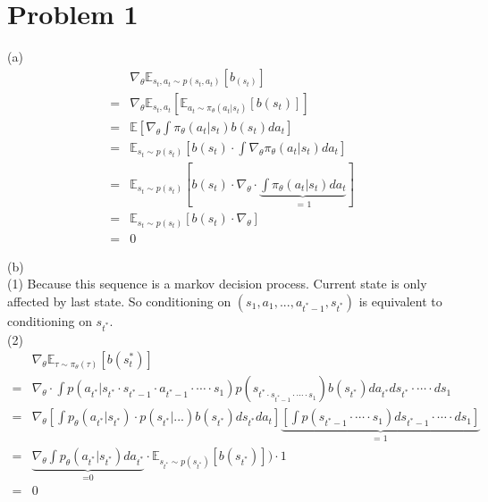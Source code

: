 \documentclass[12pt]{article}
\begin{document}
\pagebreak

\section{Problem 1}
(a)
\begin{equation}
\begin{aligned}
  & \nabla_\theta \mathbb{E}_{s_t, a_t \sim p(s_t, a_t)}[b_{(s_t)}]  \\
= & \nabla_\theta \mathbb{E}_{s_t, a_t}[\mathbb{E}_{a_t \sim \pi_\theta(a_t|s_t)}[b(s_t)]] \\
= & \mathbb{E} [\nabla_\theta \int \pi_\theta(a_t|s_t)b(s_t)da_t] \\
= & \mathbb{E}_{s_t \sim p(s_t)} [b(s_t) \cdot \int \nabla_\theta \pi_\theta(a_t|s_t)da_t] \\
= & \mathbb{E}_{s_t \sim p(s_t)}[b(s_t) \cdot \nabla_\theta \cdot \underbrace{\int \pi_\theta(a_t|s_t)da_t}_{\text{ = 1}}] \\
= & \mathbb{E}_{s_t \sim p(s_t)}[b(s_t) \cdot \nabla_\theta] \\
= & 0
\end{aligned}
\end{equation}

(b) \\
(1) Because this sequence is a markov decision process. Current state is only affected by last state. So conditioning on $(s_1, a_1, ..., a_{t^*-1}, s_{t^*})$ is equivalent to conditioning on $s_{t^*}$. \\
(2) 
\begin{equation}
\begin{aligned}
  & \nabla_\theta \mathbb{E}_{\tau \sim \pi_\theta(\tau)}[b(s_t^*)] \\
= & \nabla_\theta \cdot \int p(a_{t^*}|s_{t^*} \cdot s_{t^*-1} \cdot a_{t^*-1} \cdot \cdots \cdot s_1) p(s_{t^* \cdot s_{t^*-1} \cdot \cdots \cdot s_1}) b(s_{t^*}) da_{t^*}ds_{t^*}\cdot \cdots \cdot ds_1 \\
= & \nabla_\theta[\int p_\theta(a_{t^*}|s_{t^*}) \cdot p(s_{t^*}| ... ) b(s_{t^*})ds_{t^*}da_t] \underbrace{[\int p(s_{t^*-1} \cdot \cdots \cdot s_1)ds_{t^*-1} \cdot \cdots \cdot ds_1]}_{\text{= 1}} \\
= & \underbrace{\nabla_\theta \int p_\theta(a_{t^*}|s_{t^*})da_{t^*}}_{\text{=0}} \cdot \mathbb{E}_{s_{t^*} \sim p(s_{t^*})}[b(s_{t^*})]) \cdot 1 \\
= & 0
\end{aligned}
\end{equation}
\end{document}
